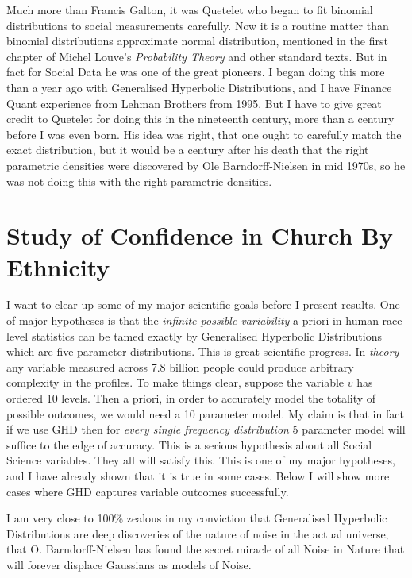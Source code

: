 \documentclass{amsart}
\begin{document}
Much more than Francis Galton, it was Quetelet who began to fit binomial distributions to social measurements carefully.  Now it is a routine matter than binomial distributions approximate normal distribution, mentioned in the first chapter of Michel Louve's {\em Probability Theory} and other standard texts.  But in fact for Social Data he was one of the great pioneers.  I began doing this more than a year ago with Generalised Hyperbolic Distributions, and I have Finance Quant experience from Lehman Brothers from 1995.  But I have to give great credit to Quetelet for doing this in the nineteenth century, more than a century before I was even born.  His idea was right, that one ought to carefully match the exact distribution, but it would be a century after his death that the right parametric densities were discovered by Ole Barndorff-Nielsen in mid 1970s, so he was not doing this with the right parametric densities.  

\section{Study of Confidence in Church By Ethnicity}

I want to clear up some of my major scientific goals before I present results.  One of major hypotheses is that the {\em infinite possible variability} a priori in human race level statistics can be tamed exactly by Generalised Hyperbolic Distributions which are five parameter distributions.  This is great scientific progress.  In {\em theory} any variable measured across 7.8 billion people could produce arbitrary complexity in the profiles.  To make things clear, suppose the variable $v$ has ordered 10 levels.  Then a priori, in order to accurately model the totality of possible outcomes, we would need a 10 parameter model.  My claim is that in fact if we use GHD then for {\em every single frequency distribution} 5 parameter model will suffice to the edge of accuracy.  This is a serious hypothesis about all Social Science variables.  They all will satisfy this.  This is one of my major hypotheses, and I have already shown that it is true in some cases.  Below I will show more cases where GHD captures variable outcomes successfully.

I am very close to 100\% zealous in my conviction that Generalised Hyperbolic Distributions are deep discoveries of the nature of noise in the actual universe, that O. Barndorff-Nielsen has found the secret miracle of all Noise in Nature that will forever displace Gaussians as models of Noise.  
\end{document}
